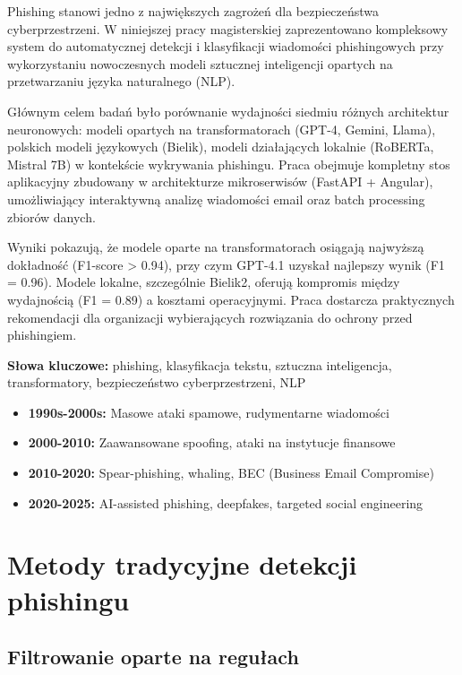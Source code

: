 \documentclass[11pt]{extreport}
\begin{document}
Phishing stanowi jedno z największych zagrożeń dla bezpieczeństwa cyberprzestrzeni. W niniejszej pracy magisterskiej zaprezentowano kompleksowy system do automatycznej detekcji i klasyfikacji wiadomości phishingowych przy wykorzystaniu nowoczesnych modeli sztucznej inteligencji opartych na przetwarzaniu języka naturalnego (NLP).

Głównym celem badań było porównanie wydajności siedmiu różnych architektur neuronowych: modeli opartych na transformatorach (GPT-4, Gemini, Llama), polskich modeli językowych (Bielik), modeli działających lokalnie (RoBERTa, Mistral 7B) w kontekście wykrywania phishingu. Praca obejmuje kompletny stos aplikacyjny zbudowany w architekturze mikroserwisów (FastAPI + Angular), umożliwiający interaktywną analizę wiadomości email oraz batch processing zbiorów danych.

Wyniki pokazują, że modele oparte na transformatorach osiągają najwyższą dokładność (F1-score > 0.94), przy czym GPT-4.1 uzyskał najlepszy wynik (F1 = 0.96). Modele lokalne, szczególnie Bielik2, oferują kompromis między wydajnością (F1 = 0.89) a kosztami operacyjnymi. Praca dostarcza praktycznych rekomendacji dla organizacji wybierających rozwiązania do ochrony przed phishingiem.

\vspace{1cm}
\noindent\textbf{Słowa kluczowe:} phishing, klasyfikacja tekstu, sztuczna inteligencja, transformatory, bezpieczeństwo cyberprzestrzeni, NLP
\newpage

\begin{itemize}[itemsep=0.5em]
    \item \textbf{1990s-2000s:} Masowe ataki spamowe, rudymentarne wiadomości
    \item \textbf{2000-2010:} Zaawansowane spoofing, ataki na instytucje finansowe
    \item \textbf{2010-2020:} Spear-phishing, whaling, BEC (Business Email Compromise)
    \item \textbf{2020-2025:} AI-assisted phishing, deepfakes, targeted social engineering
\end{itemize}

\section{Metody tradycyjne detekcji phishingu}
\label{sec:metody-tradycyjne}

\subsection{Filtrowanie oparte na regułach}
\end{document}
